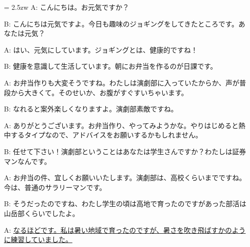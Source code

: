 \documentclass[11pt]{amsart}
\title{}
\author{}
\newenvironment{hangall}[1]{\hangindent = 2.5zw\everypar{\hangindent = 2.5zw}}{}
\begin{document}
\maketitle
\begin{hangall}{}%
A: こんにちは。お元気ですか？

B: こんにちは元気ですよ。今日も趣味のジョギングをしてきたところです。あなたは元気？

A: はい、元気にしています。ジョギングとは、健康的ですね！

B: 健康を意識して生活しています。朝にお弁当を作るのが日課です。

A: お弁当作りも大変そうですね。わたしは演劇部に入っていたからか、声が普段から大きくて。そのせいか、お腹がすぐすいちゃいます。

B: なれると案外楽しくなりますよ。演劇部素敵ですね。

A: ありがとうございます。お弁当作り、やってみようかな。やりはじめると熱中するタイプなので、アドバイスをお願いするかもしれません。

B: 任せて下さい！演劇部ということはあなたは学生さんですか？わたしは証券マンなんです。

A: お弁当の件、宜しくお願いいたします。演劇部は、高校くらいまでですね。今は、普通のサラリーマンです。

B: そうだったのですね、わたし学生の頃は高地で育ったのですがあった部活は山岳部くらいでしたよ。

A: \ul{なるほどです。私は暑い地域で育ったのですが、暑さを吹き飛ばすかのように練習していました。}\end{hangall}
\end{document}
